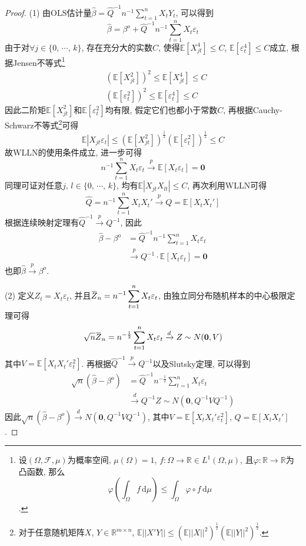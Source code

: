 \documentclass[cn,12pt,math=mtpro2,citestyle=gb7714-2015,bibstyle=gb7714-2015,twocol,mode=simple]{elegantbook}
\newcommand{\overbar}[1]{\mkern 1.5mu\overline{\mkern-1.5mu#1\mkern-1.5mu}\mkern 1.5mu}
\newcommand{\R}{\mathbb{R}}
\newcommand{\E}{\mathbb{E}}
\newcommand{\hbeta}{\hat{\beta}}
\begin{document}
  \begin{proof}
    (1) 由OLS估计量$\displaystyle \hbeta=\hat{Q}^{-1}n^{-1}\sum_{t=1}^{n}X_tY_t$, 可以得到
    $$\hbeta=\beta^o+\hat{Q}^{-1}n^{-1}\sum_{t=1}^{n}X_t\varepsilon_t$$
    由于对$\forall j \in \{0$, $\cdots$, $k\}$, 存在充分大的实数$C$, 使得$\E[X_{jt}^4]\leq C$, $\E[\varepsilon_t^4]\leq C$成立, 根据Jensen不等式\footnote{设$(\Omega,\mathcal{F},\mu)$为概率空间, $\mu(\Omega)=1$, $f:\Omega\to\R\in L^1(\Omega,\mu)$, 且$\varphi:\R\to\R$为凸函数, 那么
    $$\displaystyle\varphi\left(\int_{\Omega}f\,\text{d}\mu\right)\leq \int_{\Omega}\varphi\circ f\,\text{d}\mu$$.}
    \begin{align*}
    &(\E[X_{jt}^2])^2\leq\E[X_{jt}^4]\leq C \\
    &(\E[\varepsilon_t^2])^2\leq\E[\varepsilon_t^4]\leq C
    \end{align*}
    因此二阶矩$\E[X_{jt}^2]$和$\E[\varepsilon_t^2]$均有限, 假定它们也都小于常数$C$, 再根据Cauchy-Schwarz不等式\footnote{对于任意随机矩阵$X$, $Y \in  \mathbb{R}^{m\times n}$, $\E||X'Y||\leq(\E||X||^2)^{\frac{1}{2}}(\E||Y||^2)^{\frac{1}{2}}.$}可得
    $$\E|X_{jt}\varepsilon_t|\leq (\E[X_{jt}^2])^{\frac{1}{2}}(\E[\varepsilon_t^2])^{\frac{1}{2}}\leq C$$
    故WLLN的使用条件成立, 进一步可得
    $$n^{-1}\sum_{t=1}^{n}X_t\varepsilon_t \xrightarrow{p} \E[X_t\varepsilon_t]=\mathbf{0}$$
    同理可证对任意$j$, $l \in \{0$, $\cdots$, $k\}$, 均有$\E|X_{jt}X_{lt}|\leq C$, 再次利用WLLN可得
    $$\hat{Q}=n^{-1}\sum_{t=1}^{n}X_tX_t'\xrightarrow{p}Q=\E[X_tX_t']$$
    根据连续映射定理有$\hat{Q}^{-1}\xrightarrow{p}Q^{-1}$, 因此
    \begin{align*}
    \hbeta-\beta^o&=\hat{Q}^{-1}n^{-1}\sum_{t=1}^{n}X_t\varepsilon_t \\
    &\xrightarrow{p}Q^{-1}\cdot\E[X_t\varepsilon_t]=\mathbf{0}
    \end{align*}
    也即$\hbeta\xrightarrow{p}{\beta}^o$.

    (2) 定义$Z_t=X_t\varepsilon_t$, 并且$\displaystyle \overbar{Z}_n=n^{-1}\sum_{t=1}^{n}X_t\varepsilon_t$, 由独立同分布随机样本的中心极限定理可得
    $$\sqrt{n}\overbar{Z}_n=n^{-\frac{1}{2}}\sum_{t=1}^{n}X_t\varepsilon_t\xrightarrow{d}Z\sim N(\mathbf{0},V)$$
    其中$V=\E[X_tX_t'\varepsilon_t^2]$. 再根据$\hat{Q}^{-1}\xrightarrow{p}Q^{-1}$以及Slutsky定理, 可以得到
    \begin{align*}
    \sqrt{n}(\hbeta-\beta^o)&=\hat{Q}^{-1}n^{-\frac{1}{2}}\sum_{t=1}^{n}X_t\varepsilon_t \\
    &\xrightarrow{d}Q^{-1}Z \sim N(\mathbf{0}, Q^{-1}VQ^{-1})
    \end{align*}
    因此$\sqrt{n}(\hbeta-\beta^o)\xrightarrow{d}N(\mathbf{0},Q^{-1}VQ^{-1})$, 其中$V=\E[X_tX_t'\varepsilon_t^2]$, $Q=\E[X_tX_t']$.


\end{proof}
\end{document}
